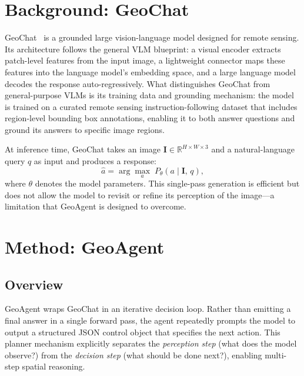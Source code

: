 \documentclass{article}
\begin{document}
\section{Background: GeoChat}
\label{sec:geochat}

GeoChat~\citep{kuckreja2024geochat} is a grounded large vision-language model
designed for remote sensing.  Its architecture follows the general VLM blueprint: a
visual encoder extracts patch-level features from the input image, a lightweight
connector maps these features into the language model's embedding space, and a
large language model decodes the response auto-regressively.  What distinguishes
GeoChat from general-purpose VLMs is its training data and grounding mechanism: the
model is trained on a curated remote sensing instruction-following dataset that
includes region-level bounding box annotations, enabling it to both answer questions
and ground its answers to specific image regions.

At inference time, GeoChat takes an image $\mathbf{I} \in \mathbb{R}^{H \times W
\times 3}$ and a natural-language query $q$ as input and produces a response:
\begin{equation}
  \hat{a} = \arg\max_{a} \; P_{\theta}(a \mid \mathbf{I},\, q),
\end{equation}
where $\theta$ denotes the model parameters.  This single-pass generation is
efficient but does not allow the model to revisit or refine its perception of the
image---a limitation that GeoAgent is designed to overcome.

\section{Method: GeoAgent}
\label{sec:method}

\subsection{Overview}

GeoAgent wraps GeoChat in an iterative decision loop.  Rather than emitting a final
answer in a single forward pass, the agent repeatedly prompts the model to output a
structured JSON control object that specifies the next action.  This planner
mechanism explicitly separates the \emph{perception step} (what does the model
observe?) from the \emph{decision step} (what should be done next?), enabling
multi-step spatial reasoning.
\end{document}
